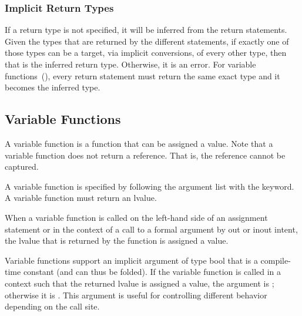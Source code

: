 \subsubsection{Implicit Return Types}
\label{Implicit_Return_Types}

If a return type is not specified, it will be inferred from the return
statements.  Given the types that are returned by the different
statements, if exactly one of those types can be a target, via
implicit conversions, of every other type, then that is the inferred
return type.  Otherwise, it is an error.  For variable
functions~(), every return statement must
return the same exact type and it becomes the inferred type.

\subsection{Variable Functions}
\label{Variable_Functions}

A variable function is a function that can be assigned a value.  Note
that a variable function does not return a reference.  That is, the
reference cannot be captured.

A variable function is specified by following the argument list with
the  keyword.  A variable function must return an lvalue.

When a variable function is called on the left-hand side of an
assignment statement or in the context of a call to a formal argument
by out or inout intent, the lvalue that is returned by the function is
assigned a value.

Variable functions support an implicit argument  of type
bool that is a compile-time constant (and can thus be folded).  If the
variable function is called in a context such that the returned lvalue
is assigned a value, the argument  is ;
otherwise it is .  This argument is useful for controlling
different behavior depending on the call site.

